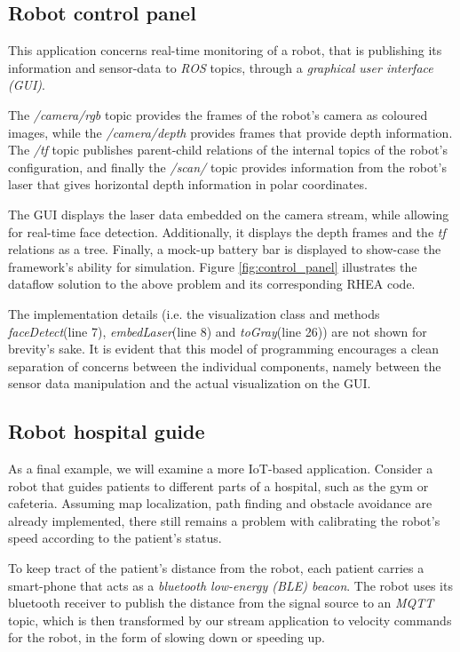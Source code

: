 \documentclass[sigplan,review,anonymous]{acmart}
\begin{document}
\subsection{Robot control panel}

This application concerns real-time monitoring of a robot, that is publishing
its information and sensor-data to \textit{ROS} topics, through a
\textit{graphical user interface (GUI)}.

The \textit{/camera/rgb} topic provides the frames of the robot's camera as
coloured images, while the \textit{/camera/depth} provides frames that provide
depth information. The \textit{/tf} topic publishes parent-child relations of
the internal topics of the robot's configuration, and finally the
\textit{/scan/} topic provides information from the robot's laser that gives
horizontal depth information in polar coordinates.

The GUI displays the laser data embedded on the camera stream, while allowing
for real-time face detection. Additionally, it displays the depth frames and the
\textit{tf} relations as a tree. Finally, a mock-up battery bar is displayed to
show-case the framework's ability for simulation. Figure \ref{fig:control_panel}
illustrates the dataflow solution to the above problem and its corresponding
\textsc{RHEA} code.


The implementation details (i.e. the visualization class and methods
\textit{faceDetect}(line 7), \textit{embedLaser}(line 8) and
\textit{toGray}(line 26)) are not shown for brevity's sake. It is evident that
this model of programming encourages a clean separation of concerns between the
individual components, namely between the sensor data manipulation and the
actual visualization on the GUI.

\subsection{Robot hospital guide}

As a final example, we will examine a more IoT-based application. Consider a
robot that guides patients to different parts of a hospital, such as the gym or
cafeteria. Assuming map localization, path finding and obstacle avoidance are
already implemented, there still remains a problem with calibrating the robot's
speed according to the patient's status.

To keep tract of the patient's distance from the robot, each patient carries a
smart-phone that acts as a \textit{bluetooth low-energy (BLE) beacon}. The robot
uses its bluetooth receiver to publish the distance from the signal source to an
\textit{MQTT} topic, which is then transformed by our stream application to
velocity commands for the robot, in the form of slowing down or speeding up.
\end{document}
